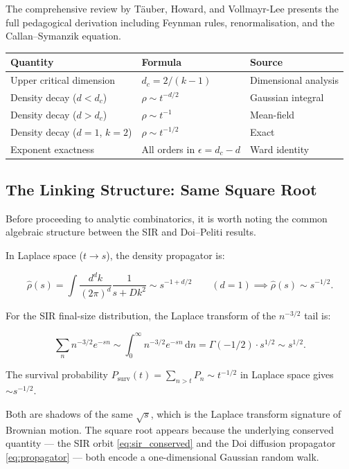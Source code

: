 \documentclass[11pt,a4paper]{article}
\theoremstyle{definition}
\newcommand{\diff}{\,\mathrm{d}}
\begin{document}
The comprehensive review by T\"auber, Howard, and Vollmayr-Lee \cite{tauber2005}
presents the full pedagogical derivation including Feynman rules, renormalisation,
and the Callan--Symanzik equation.

\begin{resultbox}
\begin{center}
\begin{tabular}{lll}
\toprule
Quantity & Formula & Source \\
\midrule
Upper critical dimension & $d_c = 2/(k-1)$ & Dimensional analysis \\
Density decay ($d < d_c$) & $\rho \sim t^{-d/2}$ & Gaussian integral \\
Density decay ($d > d_c$) & $\rho \sim t^{-1}$ & Mean-field \\
Density decay ($d=1$, $k=2$) & $\rho \sim t^{-1/2}$ & Exact \\
Exponent exactness & All orders in $\epsilon = d_c - d$ & Ward identity \\
\bottomrule
\end{tabular}
\end{center}
\end{resultbox}

\subsection{The Linking Structure: Same Square Root}

Before proceeding to analytic combinatorics, it is worth noting the common
algebraic structure between the SIR and Doi--Peliti results.

In Laplace space ($t \to s$), the density propagator is:

\[
  \hat\rho(s) = \int \frac{d^dk}{(2\pi)^d} \frac{1}{s + Dk^2} \sim s^{-1+d/2}
  \qquad (d=1) \implies \hat\rho(s) \sim s^{-1/2}.
\]

For the SIR final-size distribution, the Laplace transform of the $n^{-3/2}$ tail is:

\[
  \sum_n n^{-3/2} e^{-sn} \sim \int_0^\infty n^{-3/2} e^{-sn}\diff n = \Gamma(-1/2)\cdot s^{1/2} \sim s^{1/2}.
\]

The survival probability $P_{\mathrm{surv}}(t) = \sum_{n>t} P_n \sim t^{-1/2}$ in Laplace space gives $\sim s^{-1/2}$.

Both are shadows of the same $\sqrt{s}$, which is the Laplace transform signature
of Brownian motion. The square root appears because the underlying conserved
quantity --- the SIR orbit \eqref{eq:sir_conserved} and the Doi diffusion
propagator \eqref{eq:propagator} --- both encode a one-dimensional Gaussian
random walk.
\end{document}
